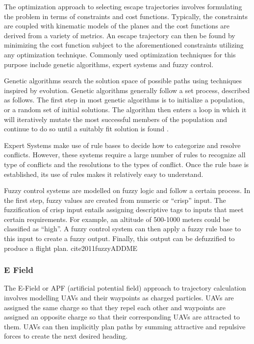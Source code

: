 \documentclass[conference]{IEEEtran}
\begin{document}
The optimization approach to selecting escape trajectories involves formulating the problem in terms of constraints and cost functions.  Typically, the constraints are coupled with kinematic models of the planes and the cost functions are derived from a variety of metrics.  An escape trajectory can then be found by minimizing the cost function subject to the aforementioned constraints utilizing any optimization technique. Commonly used optimization techniques for this purpose include genetic algorithms, expert systems and fuzzy control.

Genetic algorithms search the solution space of possible paths using techniques inspired by evolution.  Genetic algorithms generally follow a set process, described as follows.  The first step in most genetic algorithms is to initialize a population, or a random set of initial solutions.  The algorithm then enters a loop in which it will iteratively mutate the most successful members of the population and continue to do so until a suitably fit solution is found \cite{siudynamic}.

Expert Systems make use of rule bases to decide how to categorize and resolve conflicts.  However, these systems require a large number of rules to recognize all type of conflicts and the resolutions to the types of conflict.  Once the rule base is established, its use of rules makes it relatively easy to understand. \cite{kuchar2000review}

Fuzzy control systems are modelled on fuzzy logic and follow a certain process.  In the first step, fuzzy values are created from numeric or “crisp” input.  The fuzzification of crisp input entails assigning descriptive tags to inputs that meet certain requirements.  For example, an altitude of 500-1000 meters could be classified as “high”.  A fuzzy control system can then apply a fuzzy rule base to this input to create a fuzzy output.  Finally, this output can be defuzzified to produce a flight plan. cite{2011fuzzyADDME}

\subsubsection{E Field}

The E-Field or APF (artificial potential field) approach to trajectory calculation involves modelling UAVs and their waypoints as charged particles.  UAVs are assigned the same charge so that they repel each other and waypoints are assigned an opposite charge so that their corresponding UAVs are attracted to them.  UAVs can then implicitly plan paths by summing attractive and repulsive forces to create the next desired heading.
\end{document}
